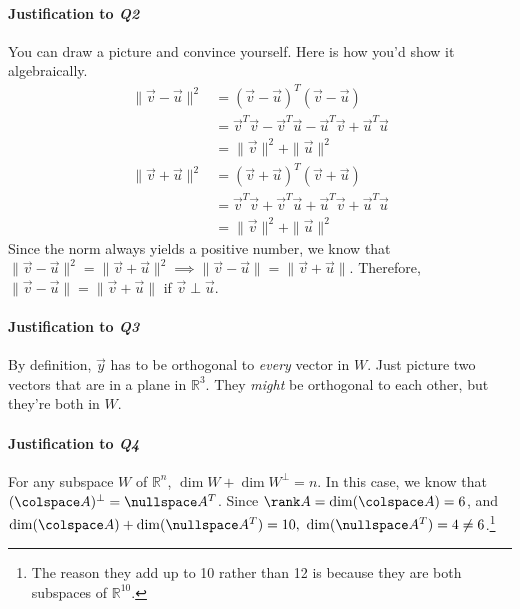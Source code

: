 	\paragraph{Justification to \textit{Q2}} You can draw a picture and convince yourself. Here is how you'd show it algebraically.
	\begin{align*}
		\|\vec{v} - \vec{u}\|^2 &= (\vec{v} - \vec{u})^T(\vec{v} - \vec{u}) \\
					           &= \vec{v}^T\vec{v} - \vec{v}^T\vec{u} - \vec{u}^T\vec{v} + \vec{u}^T\vec{u} \\
	                                           &= \|\vec{v}\|^2 + \|\vec{u}\|^2
	\end{align*}
	\begin{align*}
		\|\vec{v} + \vec{u}\|^2 &= (\vec{v} + \vec{u})^T(\vec{v} + \vec{u}) \\
				           &= \vec{v}^T\vec{v} + \vec{v}^T\vec{u} + \vec{u}^T\vec{v} + \vec{u}^T\vec{u} \\
                                           &= \|\vec{v}\|^2 + \|\vec{u}\|^2
	\end{align*}
	Since the norm always yields a positive number, we know that 
	\(\|\vec{v} - \vec{u}\|^2 = \|\vec{v} + \vec{u}\|^2 \implies \|\vec{v} - \vec{u}\| = \|\vec{v} + \vec{u}\|\). Therefore, 
	\(\|\vec{v} - \vec{u}\| = \|\vec{v} + \vec{u}\|\) if \(\vec{v} \perp \vec{u}\).
	
	\paragraph{Justification to \textit{Q3}} By definition, \(\vec{y}\) has to be orthogonal to \emph{every} vector in \(W\). Just picture two vectors that are in a
			plane in \(\mathbb{R}^3\). They \emph{might} be orthogonal to each other, but they're both in \(W\).
	
	\paragraph{Justification to \textit{Q4}} For any subspace \(W\) of \(\mathbb{R}^n\), \(\dim W + \dim W^\perp = n\). In this case, we know that 
			\((\colspace A)^\perp = \nullspace A^T\). Since \(\rank A = \dim(\colspace A) = 6\), and \(\dim(\colspace A) + \dim(\nullspace A^T) = 10,\)
			\(\dim(\nullspace A^T) = 4 \ne 6\).\footnote{The reason they add up to 10 rather than 12 is because they are both subspaces of 
			\(\mathbb{R}^{10}\).}
	
